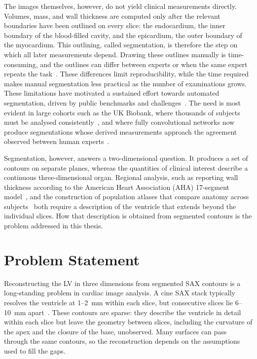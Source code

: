 The images themselves, however, do not yield clinical measurements directly.
Volumes, mass, and wall thickness are computed only after the relevant
boundaries have been outlined on every slice: the endocardium, the inner
boundary of the blood-filled cavity, and the epicardium, the outer boundary of
the myocardium. This outlining, called segmentation, is therefore the step on
which all later measurements depend. Drawing these outlines manually is
time-consuming, and the outlines can differ between experts or when the same
expert repeats the task~\parencite{petitjean2011segmentationreview}. These differences limit
reproducibility, while the time required makes manual segmentation less
practical as the number of examinations grows.
These limitations have motivated a sustained effort towards automated
segmentation, driven by public benchmarks and challenges~\parencite{suinesiaputra2014collaborative,bernard2018acdc,campello2021mnms}.
The need is most evident in large cohorts such as the UK Biobank, where
thousands of subjects must be analysed consistently~\parencite{sudlow2015ukbiobank}, and where fully convolutional networks now
produce segmentations whose derived measurements approach the agreement
observed between human experts~\parencite{bai2018automated}.

Segmentation, however, answers a two-dimensional question. It produces a set of
contours on separate planes, whereas the quantities of clinical interest
describe a continuous three-dimensional organ. Regional analysis, such as
reporting wall thickness according to the American Heart Association (AHA)
17-segment model~\parencite{cerqueira2002segmentation}, and the construction
of population atlases that compare anatomy across subjects~\parencite{bai2015biventricularatlas,demarvao2014atlas} both require a
description of the ventricle that extends beyond the individual slices. How
that description is obtained from segmented contours is the problem addressed
in this thesis.

\section{Problem Statement}
\label{sec:problem}
\noindent
Reconstructing the LV in three dimensions from segmented SAX contours is a
long-standing problem in cardiac image analysis. A cine SAX stack typically
resolves the ventricle at 1--2~mm within each slice, but consecutive
slices lie 6--10~mm apart~\parencite{petitjean2011segmentationreview}.
These contours are sparse: they describe the ventricle in detail within each
slice but leave the geometry between slices, including the curvature of the
apex and the closure of the base, unobserved. Many surfaces can pass through
the same contours, so the reconstruction depends on the assumptions used to
fill the gaps.

